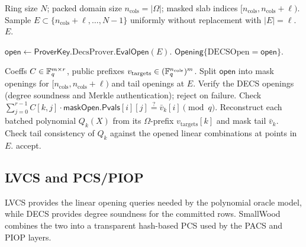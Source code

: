 \begin{algorithm}[H]
\caption{\textsf{LVCS.ChooseE}(\(\ell,n_{\mathrm{cols}}\)) \(\to E\) (verifier)}
\label{alg:lvcs-choosee}
\begin{algorithmic}[1]
\Require Ring size \(N\); packed domain size \(n_{\mathrm{cols}}=|\Omega|\); masked slab indices \([n_{\mathrm{cols}},n_{\mathrm{cols}}+\ell)\).
\State Sample \(E\subset \{n_{\mathrm{cols}}+\ell,\dots,N-1\}\) uniformly without replacement with \(|E|=\ell\).
\State \Return \(E\).
\end{algorithmic}
\end{algorithm}

\begin{algorithm}[H]
\caption{\textsf{LVCS.EvalFinish}(\(\mathsf{ProverKey},E\)) \(\to \mathsf{Opening}\) (prover)}
\label{alg:lvcs-evalfinish}
\begin{algorithmic}[1]
\State \(\mathsf{open}\gets \mathsf{ProverKey}.\mathrm{DecsProver}.\textsf{EvalOpen}(E)\).
\State \Return \(\mathsf{Opening}\{\mathrm{DECSOpen}=\mathsf{open}\}\).
\end{algorithmic}
\end{algorithm}

\begin{algorithm}[H]
\caption{\textsf{LVCS.EvalStep2}(\(\{\bar v_k\},E,\mathsf{open},C,v_{\mathrm{targets}}\)) (verifier)}
\label{alg:lvcs-evalstep2}
\begin{algorithmic}[1]
\Require Coeffs \(C\in\mathbb{F}_q^{m\times r}\), public prefixes \(v_{\mathrm{targets}}\in(\mathbb{F}_q^{n_{\mathrm{cols}}})^{m}\).
\State Split \(\mathsf{open}\) into mask openings for \([n_{\mathrm{cols}},n_{\mathrm{cols}}+\ell)\) and tail openings at \(E\).
\State Verify the DECS openings (degree soundness and Merkle authentication); reject on failure.
  \State Check \(\sum_{j=0}^{r-1} C[k,j]\cdot \mathsf{maskOpen.Pvals}[i][j] \stackrel{?}{=} \bar v_k[i]\pmod q\).
\EndFor
\State Reconstruct each batched polynomial \(Q_k(X)\) from its \(\Omega\)-prefix \(v_{\mathrm{targets}}[k]\) and mask tail \(\bar v_k\).
\State Check tail consistency of \(Q_k\) against the opened linear combinations at points in \(E\).
\State \Return accept.
\end{algorithmic}
\end{algorithm}

\subsection{LVCS and PCS/PIOP}
LVCS provides the linear opening queries needed by the polynomial oracle model,
while DECS provides degree soundness for the committed rows. SmallWood combines
the two into a transparent hash-based PCS used by the PACS and PIOP layers.


